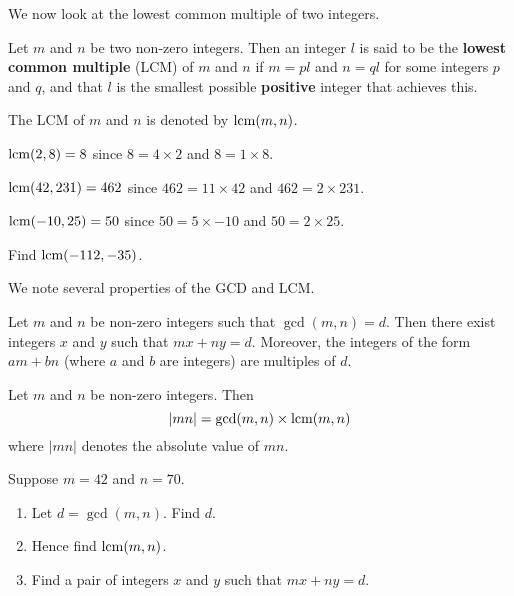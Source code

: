 We now look at the lowest common multiple of two integers.
\begin{definition}
    Let $m$ and $n$ be two non-zero integers. Then an integer $l$ is said to be the \textbf{lowest common multiple} (LCM) of $m$ and $n$ if $m = pl$ and $n = ql$ for some integers $p$ and $q$, and that $l$ is the smallest possible \textbf{positive} integer that achieves this.
\end{definition}
The LCM of $m$ and $n$ is denoted by $\mathrm{lcm}(m,n)$.

\begin{example}
    $\mathrm{lcm}(2, 8) = 8$ since $8 = 4 \times 2$ and $8 = 1 \times 8$.
\end{example}
\begin{example}
    $\mathrm{lcm}(42, 231) = 462$ since $462 = 11 \times 42$ and $462 = 2 \times 231$.
\end{example}
\begin{example}
    $\mathrm{lcm}(-10, 25) = 50$ since $50 = 5 \times -10$ and $50 = 2 \times 25$.
\end{example}
\begin{exercise}
    Find $\mathrm{lcm}(-112, -35)$.
\end{exercise}

We note several properties of the GCD and LCM.
\begin{lemma}[B\'{e}zout]\label{lemma-bezout}
    Let $m$ and $n$ be non-zero integers such that $\gcd(m, n) = d$. Then there exist integers $x$ and $y$ such that $mx + ny = d$. Moreover, the integers of the form $am + bn$ (where $a$ and $b$ are integers) are multiples of $d$.
\end{lemma}
\begin{proposition}
    Let $m$ and $n$ be non-zero integers. Then
    \[
        |mn| = \gcd(m,n) \times \mathrm{lcm}(m,n)    
    \]
    where $|mn|$ denotes the absolute value of $mn$.
\end{proposition}

\begin{exercise}
    Suppose $m = 42$ and $n = 70$.
    \begin{enumerate}[label=(\roman*)]
        \item Let $d = \gcd(m,n)$. Find $d$.
        \item Hence find $\mathrm{lcm}(m,n)$.
        \item Find a pair of integers $x$ and $y$ such that $mx + ny = d$.
    \end{enumerate}
\end{exercise}

